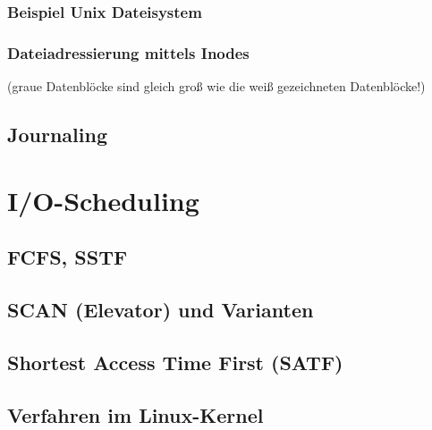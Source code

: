 \subsubsection{Beispiel Unix Dateisystem}
\subsubsection*{Dateiadressierung mittels Inodes}
(graue Datenblöcke sind gleich groß wie die weiß gezeichneten Datenblöcke!)

\subsection{Journaling}

\section{I/O-Scheduling}
\subsection{FCFS, SSTF}

\subsection{SCAN (Elevator) und Varianten}

\subsection{Shortest Access Time First (SATF)}

\subsection{Verfahren im Linux-Kernel}




